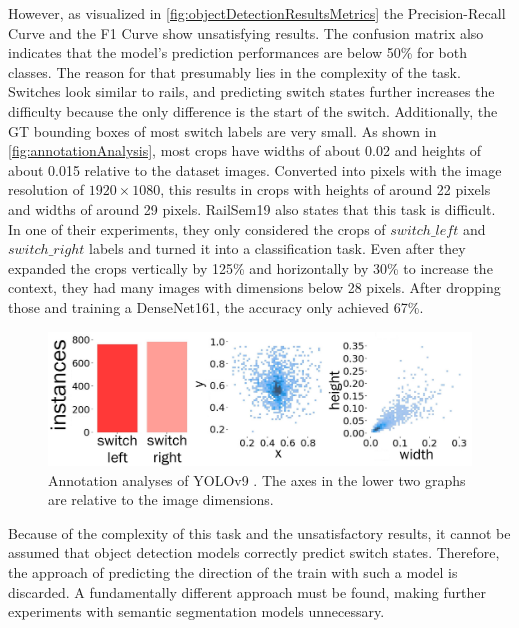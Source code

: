 \clearpage

\noindent However, as visualized in \autoref{fig:objectDetectionResultsMetrics} the Precision-Recall Curve and the F1 Curve show unsatisfying results.
The confusion matrix also indicates that the model's prediction performances are below 50\% for both classes.
The reason for that presumably lies in the complexity of the task.
Switches look similar to rails, and predicting switch states further increases the difficulty because the only difference is the start of the switch.
Additionally, the \ac{GT} bounding boxes of most switch labels are very small.
As shown in \autoref{fig:annotationAnalysis}, most crops have widths of about 0.02 and heights of about 0.015 relative to the dataset images.
Converted into pixels with the image resolution of $1920 \times 1080$, this results in crops with heights of around 22 pixels and widths of around 29 pixels.
RailSem19 \cite{railsem19dataset} also states that this task is difficult.
In one of their experiments, they only considered the crops of $switch\_left$ and $switch\_right$ labels and turned it into a classification task.
Even after they expanded the crops vertically by 125\% and horizontally by 30\% to increase the context, they had many images with dimensions below 28 pixels.
After dropping those and training a DenseNet161, the accuracy only achieved 67\%.

\vspace{0.5cm}

\begin{figure}[H]
    \centering
    \includegraphics[width=\linewidth]{PICs/experiments/objectdetectionExperiment/labels_updated_v2.jpg}
    \caption{Annotation analyses of \ac{YOLO}v9 \cite{YOLOv9GitHub}. The axes in the lower two graphs are relative to the image dimensions.}
    \label{fig:annotationAnalysis}
\end{figure}


\noindent Because of the complexity of this task and the unsatisfactory results, it cannot be assumed that object detection models correctly predict switch states.
Therefore, the approach of predicting the direction of the train with such a model is discarded.
A fundamentally different approach must be found, making further experiments with semantic segmentation models unnecessary.